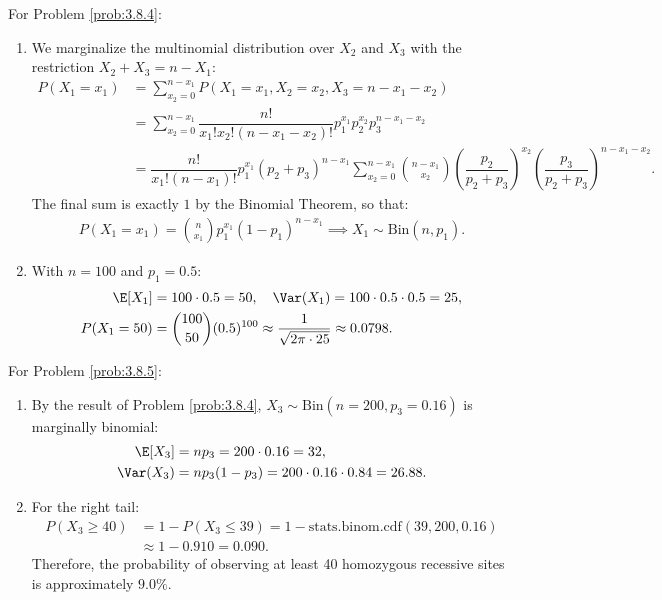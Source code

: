 \begin{solucion}
	\label{sol:3.8.4}
	For Problem \ref{prob:3.8.4}:
	\begin{enumerate}
		\item We marginalize the multinomial distribution over $X_{2}$ and $X_{3}$ with the restriction $X_{2} + X_{3} = n - X_{1}$:
		\begin{align*}
			P(X_{1} = x_{1}) &= \sum_{x_{2}=0}^{n-x_{1}} P(X_{1} = x_{1}, X_{2} = x_{2}, X_{3} = n - x_{1} - x_{2}) \\
			&= \sum_{x_{2}=0}^{n-x_{1}} \dfrac{n!}{x_{1}! x_{2}! (n - x_{1} - x_{2})!} p_{1}^{x_{1}} p_{2}^{x_{2}} p_{3}^{n-x_{1}-x_{2}} \\
			&= \dfrac{n!}{x_{1}! (n-x_{1})!} p_{1}^{x_{1}} (p_{2} + p_{3})^{n-x_{1}} \sum_{x_{2}=0}^{n-x_{1}} \binom{n-x_{1}}{x_{2}} \left(\dfrac{p_{2}}{p_{2}+p_{3}}\right)^{x_{2}} \left(\dfrac{p_{3}}{p_{2}+p_{3}}\right)^{n-x_{1}-x_{2}}.
		\end{align*}
		The final sum is exactly $1$ by the Binomial Theorem, so that:
		\begin{align*}
			P(X_{1} = x_{1}) = \binom{n}{x_{1}} p_{1}^{x_{1}} (1 - p_{1})^{n - x_{1}} \implies X_{1} \sim \text{Bin}(n, p_{1}).
		\end{align*}
		\item With $n = 100$ and $p_{1} = 0.5$:
		\begin{align*}
			\E[X_{1}] &= 100 \cdot 0.5 = 50, \quad \Var(X_{1}) = 100 \cdot 0.5 \cdot 0.5 = 25, \\
			P(X_{1} = 50) &= \binom{100}{50} (0.5)^{100} \approx \dfrac{1}{\sqrt{2\pi \cdot 25}} \approx 0.0798.
		\end{align*}
	\end{enumerate}
\end{solucion}

\begin{solucion}
	\label{sol:3.8.5}
	For Problem \ref{prob:3.8.5}:
	\begin{enumerate}
		\item By the result of Problem \ref{prob:3.8.4}, $X_{3} \sim \text{Bin}(n = 200, p_{3} = 0.16)$ is marginally binomial:
		\begin{align*}
			\E[X_{3}] &= np_{3} = 200 \cdot 0.16 = 32, \\
			\Var(X_{3}) &= np_{3}(1 - p_{3}) = 200 \cdot 0.16 \cdot 0.84 = 26.88.
		\end{align*}
		\item For the right tail:
		\begin{align*}
			P(X_{3} \ge 40) &= 1 - P(X_{3} \le 39) = 1 - \text{stats.binom.cdf}(39, 200, 0.16) \\
			&\approx 1 - 0.910 = 0.090.
		\end{align*}
		Therefore, the probability of observing at least 40 homozygous recessive sites is approximately $9.0\%$.
	\end{enumerate}
\end{solucion}

